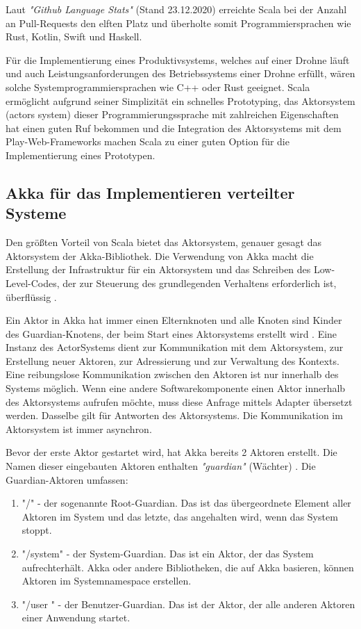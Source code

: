 Laut \textit{"Github Language Stats"} (Stand 23.12.2020) erreichte Scala bei der Anzahl an Pull-Requests den elften Platz und überholte somit Programmiersprachen wie Rust, Kotlin, Swift und Haskell.

Für die Implementierung eines Produktivsystems, welches auf einer Drohne läuft und auch Leistungsanforderungen des Betriebssystems einer Drohne erfüllt, wären solche Systemprogrammiersprachen wie C++ oder Rust geeignet. Scala ermöglicht aufgrund seiner Simplizität ein schnelles Prototyping, das Aktorsystem (actors system) dieser Programmierungssprache mit zahlreichen Eigenschaften hat einen guten Ruf bekommen und die Integration des Aktorsystems mit dem Play-Web-Frameworks machen Scala zu einer guten Option für die Implementierung eines Prototypen.

\subsection{Akka für das Implementieren verteilter Systeme}

Den größten Vorteil von Scala bietet das Aktorsystem, genauer gesagt das Aktorsystem der Akka-Bibliothek. Die Verwendung von Akka macht die Erstellung der Infrastruktur für ein Aktorsystem und das Schreiben des Low-Level-Codes, der zur Steuerung des grundlegenden Verhaltens erforderlich ist, überflüssig \cite{Odersky04anoverview}.

Ein Aktor in Akka hat immer einen Elternknoten und alle Knoten sind Kinder des Guardian-Knotens, der beim Start eines Aktorsystems erstellt wird \cite{akka}. Eine Instanz des ActorSystems dient zur Kommunikation mit dem Aktorsystem, zur Erstellung neuer Aktoren, zur Adressierung und zur Verwaltung des Kontexts. Eine reibungslose Kommunikation zwischen den Aktoren ist nur innerhalb des Systems möglich. Wenn eine andere Softwarekomponente einen Aktor innerhalb des Aktorsystems aufrufen möchte, muss diese Anfrage mittels Adapter übersetzt werden. Dasselbe gilt für Antworten des Aktorsystems. Die Kommunikation im Aktorsystem ist immer asynchron.

Bevor der erste Aktor gestartet wird, hat Akka bereits 2 Aktoren erstellt. Die Namen dieser eingebauten Aktoren enthalten \textit{"guardian"} (Wächter) \cite{akka}. Die Guardian-Aktoren umfassen:

\begin{enumerate}
	\item "/" - der sogenannte Root-Guardian. Das ist das übergeordnete Element aller Aktoren im System und das letzte, das angehalten wird, wenn das System stoppt.
	
	\item "/system" - der System-Guardian. Das ist ein Aktor, der das System aufrechterhält. Akka oder andere Bibliotheken, die auf Akka basieren, können Aktoren im Systemnamespace erstellen.
	
	\item "/user " - der Benutzer-Guardian. Das ist der Aktor, der alle anderen Aktoren einer Anwendung startet.
\end{enumerate}


